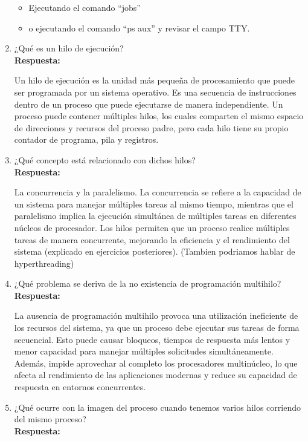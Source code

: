 \documentclass[a4paper,12pt]{article}
\begin{document}
\begin{enumerate}[label=\textbf{Pregunta \arabic*.}]
    \begin{itemize}
        \item Ejecutando el comando “jobs”

        \item o ejecutando el comando “ps aux” y revisar el campo TTY.
    \end{itemize}

    \item ¿Qué es un hilo de ejecución? \\ %
    \textbf{Respuesta:} 
    
    Un hilo de ejecución es la unidad más pequeña de procesamiento que puede ser programada por un sistema operativo. Es una secuencia de instrucciones dentro de un proceso que puede ejecutarse de manera independiente. Un proceso puede contener múltiples hilos, los cuales comparten el mismo espacio de direcciones y recursos del proceso padre, pero cada hilo tiene su propio contador de programa, pila y registros.

    \item ¿Qué concepto está relacionado con dichos hilos? \\ %
    \textbf{Respuesta:} 
    
    La concurrencia y la paralelismo. La concurrencia se refiere a la capacidad de un sistema para manejar múltiples tareas al mismo tiempo, mientras que el paralelismo implica la ejecución simultánea de múltiples tareas en diferentes núcleos de procesador. Los hilos permiten que un proceso realice múltiples tareas de manera concurrente, mejorando la eficiencia y el rendimiento del sistema (explicado en ejercicios posteriores). (Tambien podriamos hablar de hyperthreading)


    \item ¿Qué problema se deriva de la no existencia de programación multihilo? \\ %
    \textbf{Respuesta:} 
    
    La ausencia de programación multihilo provoca una utilización ineficiente de los recursos del sistema, ya que un proceso debe ejecutar sus tareas de forma secuencial. Esto puede causar bloqueos, tiempos de respuesta más lentos y menor capacidad para manejar múltiples solicitudes simultáneamente. Además, impide aprovechar al completo los procesadores multinúcleo, lo que afecta al rendimiento de las aplicaciones modernas y reduce su capacidad de respuesta en entornos concurrentes.      

    \item ¿Qué ocurre con la imagen del proceso cuando tenemos varios hilos corriendo del mismo proceso? \\ %
    \textbf{Respuesta:} 
    

\end{enumerate}
\end{document}
